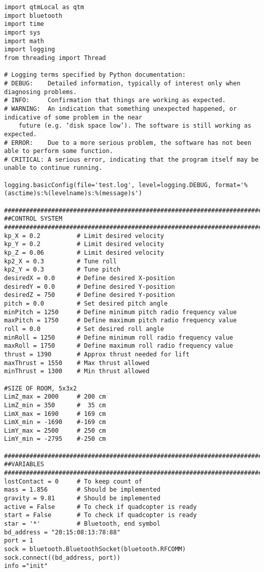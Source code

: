 \begin{lstlisting}
import qtmLocal as qtm
import bluetooth
import time
import sys
import math
import logging
from threading import Thread

# Logging terms specified by Python documentation:
# DEBUG:    Detailed information, typically of interest only when diagnosing problems.
# INFO:     Confirmation that things are working as expected.
# WARNING:  An indication that something unexpected happened, or indicative of some problem in the near 
    future (e.g. ‘disk space low’). The software is still working as expected.
# ERROR:    Due to a more serious problem, the software has not been able to perform some function.
# CRITICAL: A serious error, indicating that the program itself may be unable to continue running.

logging.basicConfig(file='test.log', level=logging.DEBUG, format='%(asctime)s:%(levelname)s:%(message)s')

##############################################################################
##CONTROL SYSTEM
##############################################################################
kp_X = 0.2          # Limit desired velocity
kp_Y = 0.2          # Limit desired velocity
kp_Z = 0.06         # Limit desired velocity
kp2_X = 0.3         # Tune roll
kp2_Y = 0.3         # Tune pitch
desiredX = 0.0      # Define desired X-position
desiredY = 0.0      # Define desired Y-position
desiredZ = 750      # Define desired Y-position
pitch = 0.0         # Set desired pitch angle
minPitch = 1250     # Define minimum pitch radio frequency value
maxPitch = 1750     # Define maximum pitch radio frequency value
roll = 0.0          # Set desired roll angle
minRoll = 1250      # Define minimum roll radio frequency value
maxRoll = 1750      # Define maximum roll radio frequency value
thrust = 1390       # Approx thrust needed for lift
maxThrust = 1550    # Max thrust allowed
minThrust = 1300    # Min thrust allowed

#SIZE OF ROOM, 5x3x2
LimZ_max = 2000     # 200 cm
LimZ_min = 350      #  35 cm
LimX_max = 1690     # 169 cm
LimX_min = -1690    #-169 cm
LimY_max = 2500     # 250 cm 
LimY_min = -2795    #-250 cm

##############################################################################
##VARIABLES
##############################################################################
lostContact = 0     # To keep count of 
mass = 1.856        # Should be implemented
gravity = 9.81      # Should be implemented
active = False      # To check if quadcopter is ready
start = False       # To check if quadcopter is ready
star = '*'          # Bluetooth, end symbol
bd_address = "20:15:08:13:78:88"
port = 1
sock = bluetooth.BluetoothSocket(bluetooth.RFCOMM)
sock.connect((bd_address, port))
info ="init"


\end{lstlisting}
